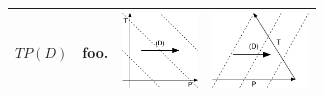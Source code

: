 \documentclass[
  12pt
]{scrartcl}
\begin{document}
\begin{center}
\begin{longtable}{m{}m{}m{}m{}}
  \midrule
  $TP(D)$ &
  foo. &
  \includegraphics[height = 2cm]{../fig/TPd.pdf} &
  \includegraphics[height = 2cm]{../fig/TPd_iso.pdf}  \\
  \bottomrule
  \end{longtable}
\end{center}

\clearpage
\end{document}
